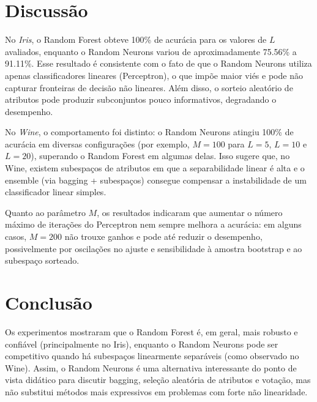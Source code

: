 \documentclass[12pt,a4paper]{article}
\begin{document}
\section{Discuss\~ao}
No \emph{Iris}, o Random Forest obteve 100\% de acur\'acia para os valores de $L$ avaliados, enquanto o Random Neurons variou de aproximadamente 75.56\% a 91.11\%. Esse resultado \'e consistente com o fato de que o Random Neurons utiliza apenas classificadores lineares (Perceptron), o que imp\~oe maior vi\'es e pode n\~ao capturar fronteiras de decis\~ao n\~ao lineares. Al\'em disso, o sorteio aleat\'orio de atributos pode produzir subconjuntos pouco informativos, degradando o desempenho.

No \emph{Wine}, o comportamento foi distinto: o Random Neurons atingiu 100\% de acur\'acia em diversas configura\c{c}\~oes (por exemplo, $M=100$ para $L=5$, $L=10$ e $L=20$), superando o Random Forest em algumas delas. Isso sugere que, no Wine, existem subespa\c{c}os de atributos em que a separabilidade linear \'e alta e o ensemble (via bagging + subespa\c{c}os) consegue compensar a instabilidade de um classificador linear simples.

Quanto ao par\^ametro $M$, os resultados indicaram que aumentar o n\'umero m\'aximo de itera\c{c}\~oes do Perceptron nem sempre melhora a acur\'acia: em alguns casos, $M=200$ n\~ao trouxe ganhos e pode at\'e reduzir o desempenho, possivelmente por oscila\c{c}\~oes no ajuste e sensibilidade \`a amostra bootstrap e ao subespa\c{c}o sorteado.

\section{Conclus\~ao}
Os experimentos mostraram que o Random Forest \'e, em geral, mais robusto e confi\'avel (principalmente no Iris), enquanto o Random Neurons pode ser competitivo quando h\'a subespa\c{c}os linearmente separ\'aveis (como observado no Wine). Assim, o Random Neurons \'e uma alternativa interessante do ponto de vista did\'atico para discutir bagging, sele\c{c}\~ao aleat\'oria de atributos e vota\c{c}\~ao, mas n\~ao substitui m\'etodos mais expressivos em problemas com forte n\~ao linearidade.
\end{document}
